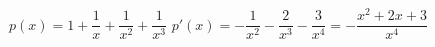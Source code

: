 {$p(x)=1+\dfrac1x+\dfrac1{x^2}+\dfrac1{x^3}$}
{$p'(x)=-\dfrac1{x^2}-\dfrac2{x^3}-\dfrac3{x^4}=-\dfrac{x^2+2x+3}{x^4}$}
